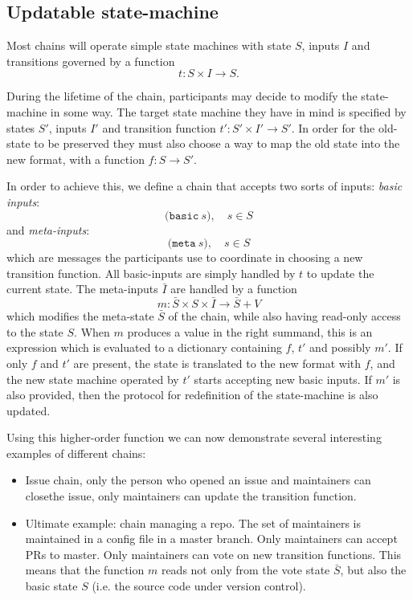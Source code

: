 \subsection{Updatable state-machine}

Most chains will operate simple state machines with state $S$, inputs $I$ and
transitions governed by a function
\[
t \colon S \times I \to S.
\]

During the lifetime of the chain, participants may decide to modify the
state-machine in some way. The target state machine they have in mind is
specified by states $S'$, inputs $I'$ and transition function $t' \colon S'
\times I' \to S'$. In order for the old-state to be preserved they must also
choose a way to map the old state into the new format, with a function $f \colon
S \to S'$.

In order to achieve this, we define a chain that accepts two sorts of inputs:
\emph{basic inputs}:
\[
\mathtt{(basic} \ s), \quad s \in S
\]
and \emph{meta-inputs}:
\[
\mathtt{(meta} \ s), \quad s \in S
\]
which are messages the participants use to coordinate in choosing a new
transition function. All basic-inputs are simply handled by $t$ to update the
current state. The meta-inputs $\bar I$ are handled by a function
\[
m \colon \bar S \times S \times \bar I \to \bar S + V
\]
which modifies the meta-state $\bar S$ of the chain, while also having read-only
access to the state $S$. When $m$ produces a value in the right summand, this is
an expression which is evaluated to a dictionary containing $f$, $t'$ and
possibly $m'$. If only $f$ and $t'$ are present, the state is translated to the
new format with $f$, and the new state machine operated by $t'$ starts accepting
new basic inputs. If $m'$ is also provided, then the protocol for redefinition
of the state-machine is also updated.

Using this higher-order function we can now demonstrate several interesting
examples of different chains:
\begin{itemize}
\item Issue chain, only the person who opened an issue and maintainers can closethe
  issue, only maintainers can update the transition function.
\item Ultimate example: chain managing a repo. The set of maintainers is
  maintained in a config file in a master branch. Only maintainers can accept PRs
  to master. Only maintainers can vote on new transition functions. This means
  that the function $m$ reads not only from the vote state $\bar S$, but also the
  basic state $S$ (i.e. the source code under version control).
\end{itemize}
